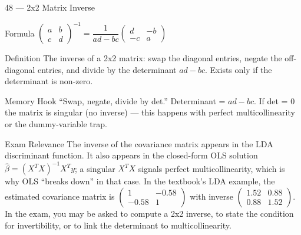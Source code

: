 \documentclass[aspectratio=169,8pt]{beamer}
\begin{document}
	\begin{frame}{48 --- 2x2 Matrix Inverse}
		\begin{block}{Formula}
			$\begin{pmatrix} a & b \\ c & d \end{pmatrix}^{-1} = \dfrac{1}{ad - bc}\begin{pmatrix} d & -b \\ -c & a \end{pmatrix}$
		\end{block}
		\begin{block}{Definition}
			The inverse of a 2x2 matrix: swap the diagonal entries, negate the off-diagonal entries, and divide by the determinant $ad - bc$. Exists only if the determinant is non-zero.
		\end{block}
		\begin{block}{Memory Hook}
			``Swap, negate, divide by det.'' Determinant = $ad - bc$. If det = 0 the matrix is singular (no inverse) --- this happens with perfect multicollinearity or the dummy-variable trap.
		\end{block}
		\begin{block}{Exam Relevance}
			The inverse of the covariance matrix appears in the LDA discriminant function. It also appears in the closed-form OLS solution $\hat{\beta} = (X^TX)^{-1}X^Ty$; a singular $X^TX$ signals perfect multicollinearity, which is why OLS ``breaks down'' in that case. In the textbook's LDA example, the estimated covariance matrix is $\begin{pmatrix}1 & -0.58\\ -0.58 & 1\end{pmatrix}$ with inverse $\begin{pmatrix}1.52 & 0.88\\ 0.88 & 1.52\end{pmatrix}$. In the exam, you may be asked to compute a 2x2 inverse, to state the condition for invertibility, or to link the determinant to multicollinearity.
		\end{block}
	\end{frame}
	
\end{document}
